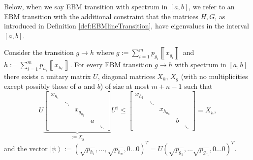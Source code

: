 \documentclass{theoretics}
\begin{document}
Below, when we say EBM transition with spectrum in $[a,b]$, we refer
to an EBM transition with the additional constraint that the matrices
$H,G$,  as introduced in Definition \ref{def:EBMlineTransition}, have eigenvalues in the interval $[a,b]$. 
\begin{lemma}
 
Consider the transition $g\to h$ where $g:=\sum_{i=1}^{m}p_{g_{i}}\left\llbracket x_{g_{i}}\right\rrbracket $
and $h:=\sum_{i=1}^{m}p_{h_{i}}\left\llbracket x_{h_{i}}\right\rrbracket $.
For every EBM transition $g\to h$ with spectrum in $[a,b]$ there
exists a unitary matrix $U$, diagonal matrices $X_{h}$, $X_{g}$
(with no multiplicities except possibly those of $a$ and $b$) of
size at most $m+n-1$ such that 
\begin{equation}
U\underbrace{\left[\begin{array}{ccccc}
x_{g_{1}}\\
 & \ddots\\
 &  & x_{g_{n_{g}}}\\
 &  &  & a\\
 &  &  &  & \ddots
\end{array}\right]}_{:=X_{g}}U^{\dagger}\le\left[\begin{array}{ccccc}
x_{h_{1}}\\
 & \ddots\\
 &  & x_{h_{n_{h}}}\\
 &  &  & b\\
 &  &  &  & \ddots
\end{array}\right]=X_{h},\label{eq:conditionEBMcharacterised}
\end{equation}
and the vector $\left|\psi\right\rangle :=(\sqrt{p_{h_{1}}},\dots,\sqrt{p_{h_{n}}},0\dots0)^{T}=U(\sqrt{p_{g_{1}}},\dots\sqrt{p_{g_{m}}},0\dots0)^{T}$.
\label{lem:EBRMisCOF}
\end{lemma}
\end{document}
